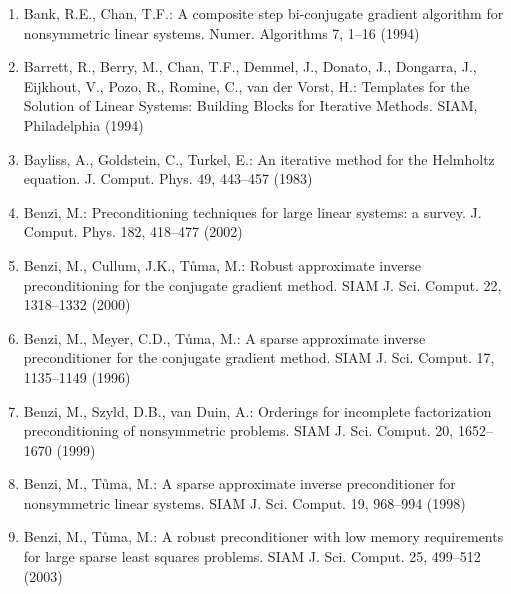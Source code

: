 \begin{enumerate}[label=\arabic*.,ref=\arabic*,leftmargin=3em]
\item\label{bib:source-17}Bank, R.E., Chan, T.F.: A composite step bi-conjugate gradient algorithm for nonsymmetric linear systems. Numer. Algorithms 7, 1–16 (1994)

\item\label{bib:source-18}Barrett, R., Berry, M., Chan, T.F., Demmel, J., Donato, J., Dongarra, J., Eijkhout, V., Pozo, R., Romine, C., van der Vorst, H.: Templates for the Solution of Linear Systems: Building Blocks for Iterative Methods. SIAM, Philadelphia (1994)

\item\label{bib:source-19}Bayliss, A., Goldstein, C., Turkel, E.: An iterative method for the Helmholtz equation. J. Comput. Phys. 49, 443–457 (1983)

\item\label{bib:source-20}Benzi, M.: Preconditioning techniques for large linear systems: a survey. J. Comput. Phys. 182, 418–477 (2002)

\item\label{bib:source-21}Benzi, M., Cullum, J.K., Tůma, M.: Robust approximate inverse preconditioning for the conjugate gradient method. SIAM J. Sci. Comput. 22, 1318–1332 (2000)

\item\label{bib:source-22}Benzi, M., Meyer, C.D., Tůma, M.: A sparse approximate inverse preconditioner for the conjugate gradient method. SIAM J. Sci. Comput. 17, 1135–1149 (1996)

\item\label{bib:source-23}Benzi, M., Szyld, D.B., van Duin, A.: Orderings for incomplete factorization preconditioning of nonsymmetric problems. SIAM J. Sci. Comput. 20, 1652–1670 (1999)

\item\label{bib:source-24}Benzi, M., Tůma, M.: A sparse approximate inverse preconditioner for nonsymmetric linear systems. SIAM J. Sci. Comput. 19, 968–994 (1998)

\item\label{bib:source-25}Benzi, M., Tůma, M.: A robust preconditioner with low memory requirements for large sparse least squares problems. SIAM J. Sci. Comput. 25, 499–512 (2003)


\end{enumerate}
